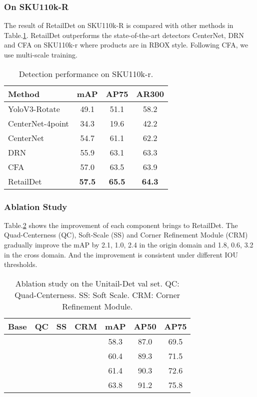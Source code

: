 \documentclass[runningheads]{llncs}
\begin{document}
\subsubsection{On SKU110k-R}
The result of RetailDet on SKU110k-R is compared with other methods in Table.\ref{table_sku110kr}. RetailDet outperforms the state-of-the-art detectors CenterNet\cite{xingyi2019centernet}, DRN \cite{SKU110k-r} and CFA \cite{Guo_2021_CFA} on SKU110k-r where products are in RBOX style. Following CFA, we use multi-scale training.
\begin{table}[t]
\centering
\begin{tabular}{l|ccc}
\hline \hline
Method           & mAP    & AP75    & AR300 \\ \hline
YoloV3-Rotate\cite{redmon2018yolov3}    & 49.1   & 51.1    & 58.2  \\
CenterNet-4point\cite{xingyi2019centernet} & 34.3   & 19.6    & 42.2  \\
CenterNet\cite{xingyi2019centernet}        & 54.7   & 61.1    & 62.2  \\
DRN\cite{SKU110k-r}              & 55.9   & 63.1    & 63.3  \\ 
CFA\cite{Guo_2021_CFA}              & 57.0   & 63.5    & 63.9  \\ 
RetailDet  & \textbf{57.5}   & \textbf{65.5}    & \textbf{64.3}  \\ 
\hline
\end{tabular}
\caption{Detection performance on SKU110k-r.}
\label{table_sku110kr}
\end{table}

\subsubsection{Ablation Study} Table.\ref{table_ablation_retaildet} shows the improvement of each component brings to RetailDet. The Quad-Centerness (QC), Soft-Scale (SS) and 
Corner Refinement Module (CRM) gradually improve the mAP by 2.1, 1.0, 2.4 in the origin domain and 1.8, 0.6, 3.2 in the cross domain. And the improvement is consistent under different IOU thresholds.

\begin{table}[t]
\centering
\begin{tabular}{cccc|ccc}
\hline \hline
Base      &QC & SS & CRM & mAP  & AP50 & AP75 \\ \hline
    &   &    &          & 58.3 & 87.0 & 69.5  \\
 &&&       & 60.4 & 89.3 & 71.5  \\
 &&&&61.4&90.3&72.6 \\
 &&&&63.8& 91.2 & 75.8 \\
\hline
\end{tabular}
\caption{Ablation study on the Unitail-Det val set. QC: Quad-Centerness. SS: Soft Scale. CRM: Corner Refinement Module.}
\label{table_ablation_retaildet}
\end{table}
\end{document}
